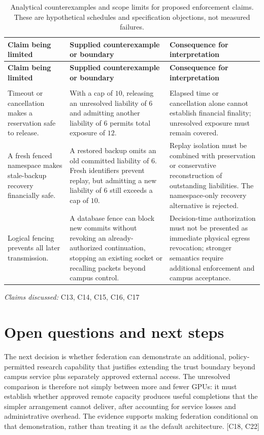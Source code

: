 \documentclass[11pt]{article}
\begin{document}
\begin{longtable}{@{}>{\raggedright\arraybackslash}p{}>{\raggedright\arraybackslash}p{}>{\raggedright\arraybackslash}p{}@{}}
\caption{Analytical counterexamples and scope limits for proposed enforcement claims. These are hypothetical schedules and specification objections, not measured failures.}\\
\toprule
\textbf{Claim being limited} & \textbf{Supplied counterexample or boundary} & \textbf{Consequence for interpretation}\\
\midrule
\endfirsthead
\toprule
\textbf{Claim being limited} & \textbf{Supplied counterexample or boundary} & \textbf{Consequence for interpretation}\\
\midrule
\endhead
\midrule
\multicolumn{3}{r}{\footnotesize Continued on next page}\\
\endfoot
\bottomrule
\endlastfoot
Timeout or cancellation makes a reservation safe to release. & With a cap of $10$, releasing an unresolved liability of $6$ and admitting another liability of $6$ permits total exposure of $12$. & Elapsed time or cancellation alone cannot establish financial finality; unresolved exposure must remain covered.\\
A fresh fenced namespace makes stale-backup recovery financially safe. & A restored backup omits an old committed liability of $6$. Fresh identifiers prevent replay, but admitting a new liability of $6$ still exceeds a cap of $10$. & Replay isolation must be combined with preservation or conservative reconstruction of outstanding liabilities. The namespace-only recovery alternative is rejected.\\
Logical fencing prevents all later transmission. & A database fence can block new commits without revoking an already-authorized continuation, stopping an existing socket or recalling packets beyond campus control. & Decision-time authorization must not be presented as immediate physical egress revocation; stronger semantics require additional enforcement and campus acceptance.\\
\end{longtable}
\par{}
\textit{Claims discussed: }C13, C14, C15, C16, C17
\section{Open questions and next steps}
The next decision is whether federation can demonstrate an additional, policy-permitted research capability that justifies extending the trust boundary beyond campus service plus separately approved external access. The unresolved comparison is therefore not simply between more and fewer GPUs: it must establish whether approved remote capacity produces useful completions that the simpler arrangement cannot deliver, after accounting for service losses and administrative overhead. The evidence supports making federation conditional on that demonstration, rather than treating it as the default architecture. [C18, C22]
\end{document}

